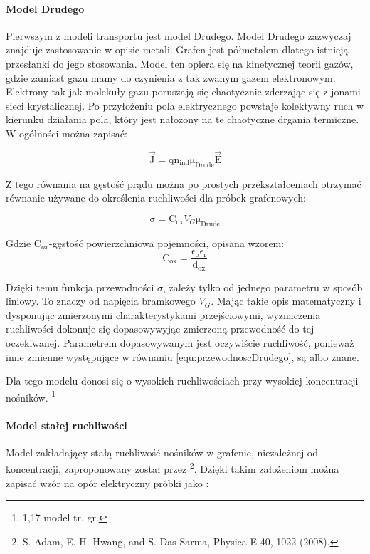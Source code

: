 \paragraph{Model Drudego}

Pierwszym z modeli transportu jest model Drudego. Model Drudego zazwyczaj znajduje zastosowanie w opisie metali. Grafen 
jest półmetalem dlatego istnieją przesłanki do jego stosowania. Model ten opiera się na kinetycznej teorii gazów, gdzie
zamiast gazu mamy do czynienia z tak zwanym gazem elektronowym. Elektrony tak jak molekuły gazu poruszają się chaotycznie
zderzając się z jonami sieci krystalicznej. Po przyłożeniu pola elektrycznego powstaje kolektywny ruch w kierunku działania 
pola, który jest nałożony na te chaotyczne drgania termiczne. 
W ogólności można zapisać:

\begin{equation}
    \mathrm{ \vec J =q n_{ind} \mu_{Drude} \vec E }
\end{equation}

Z tego równania na gęstość prądu można po prostych przekształceniach otrzymać równanie używane do określenia ruchliwości 
dla próbek grafenowych:

\begin{equation}
   \mathrm{ \sigma = C_{ox}} V_G\mathrm{ \mu_{Drude}}
	\label{equ:przewodnoscDrudego}
\end{equation}

Gdzie C$_{ox}$-gęstość powierzchniowa pojemności, opisana wzorem:
\begin{equation}
   \mathrm{C_{ox}= \frac {\epsilon_o \epsilon_r}{d_{ox}}}
\end{equation}

Dzięki temu funkcja przewodności $\sigma$, zależy tylko od jednego parametru w sposób liniowy. To znaczy od napięcia
bramkowego $V_G$. Mając takie opis matematyczny i dysponując zmierzonymi charakterystykami przejściowymi, wyznaczenia
ruchliwości dokonuje się dopasowywyjąc zmierzoną przewodność do tej oczekiwanej. Parametrem dopasowywanym jest oczywiście
ruchliwość, ponieważ inne zmienne występujące w równaniu \ref{equ:przewodnoscDrudego}, są albo znane.

Dla tego modelu donosi się o wysokich ruchliwościach przy wysokiej koncentracji nośników. \footnote{1,17 model tr. gr.}

\paragraph{Model stałej ruchliwości}
Model zakładający stałą ruchliwość nośników w grafenie, niezależnej od koncentracji, zaproponowany został przez 
\footnote{S. Adam, E. H. Hwang, and S. Das Sarma, Physica E 40, 1022 (2008).}. 
Dzięki takim założeniom można zapisać wzór na opór elektryczny próbki jako :

